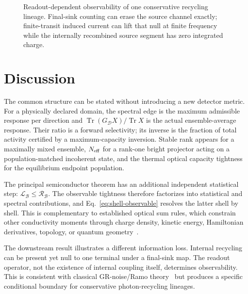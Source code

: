 \documentclass[aps,twocolumn,superscriptaddress,longbibliography]{revtex4-2}
\newcommand{\Tr}{\operatorname{Tr}}
\newcommand{\cB}{\mathcal B}
\newcommand{\cD}{\mathcal D}
\newcommand{\cR}{\mathcal R}
\newcommand{\cL}{\mathcal L}
\begin{document}
\begin{figure}[t]
\centering
{}
\caption{Readout-dependent observability of one conservative recycling lineage. Final-sink counting can erase the source channel exactly; finite-transit induced current can lift that null at finite frequency while the internally recombined source segment has zero integrated charge.}
\label{fig:recycling}
\end{figure}

\section{Discussion}

The common structure can be stated without introducing a new detector metric. For a physically declared domain, the spectral edge is the maximum admissible response per direction and $\Tr(G_{\cD}X)/\Tr X$ is the actual ensemble-average response. Their ratio is a forward selectivity; its inverse is the fraction of total activity certified by a maximum-capacity inversion. Stable rank appears for a maximally mixed ensemble, $N_{\rm eff}$ for a rank-one bright projector acting on a population-matched incoherent state, and the thermal optical capacity tightness for the equilibrium endpoint population.

The principal semiconductor theorem has an additional independent statistical step: $\cL_{\cB}\le\cR_{\cB}$. The observable tightness therefore factorizes into statistical and spectral contributions, and Eq.~\eqref{eq:shell-observable} resolves the latter shell by shell. This is complementary to established optical sum rules, which constrain other conductivity moments through charge density, kinetic energy, Hamiltonian derivatives, topology, or quantum geometry~\cite{Watanabe2020,Gusynin2006,Gusynin2007,Onishi2024,Mao2025}.

The downstream result illustrates a different information loss. Internal recycling can be present yet null to one terminal under a final-sink map. The readout operator, not the existence of internal coupling itself, determines observability. This is consistent with classical GR-noise/Ramo theory~\cite{Dabrowski1987,Dabrowski1989} but produces a specific conditional boundary for conservative photon-recycling lineages.
\end{document}
